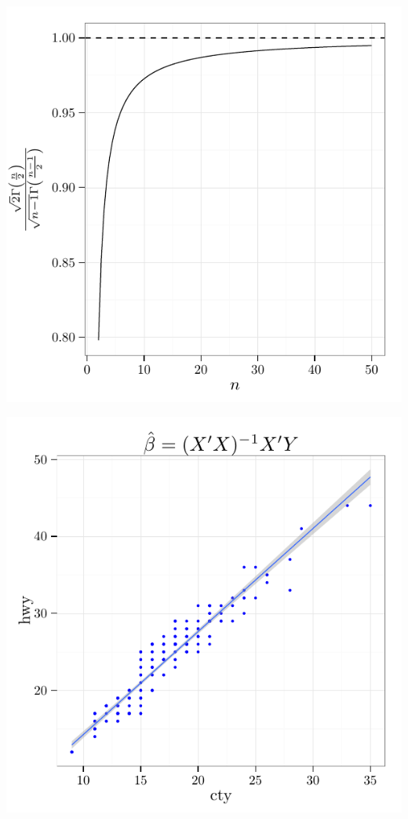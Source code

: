 \documentclass{article}\usepackage[]{graphicx}\usepackage[]{color}
\makeatletter
\def\maxwidth{ %
  \ifdim\Gin@nat@width>\linewidth
    \linewidth
  \else
    \Gin@nat@width
  \fi
}
\newenvironment{knitrout}{}{} %
\theoremstyle{rcode}
\makeatother
\begin{document}
\begin{knitrout}
\color{fgcolor}

{\centering \includegraphics[width=1.0\textwidth]{figure/molatexFIG-1} 

}



\end{knitrout}

\begin{knitrout}
\color{fgcolor}

{\centering \includegraphics[width=\maxwidth]{figure/base-1} 

}



\end{knitrout}
\end{document}
